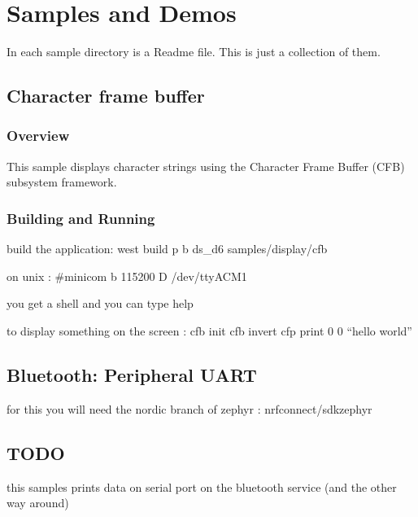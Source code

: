 \documentclass[letterpaper,10pt,english]{sphinxmanual}
\begin{document}
\chapter{Samples and Demos}
\label{\detokenize{samples/index:samples-and-demos}}\label{\detokenize{samples/index:id1}}\label{\detokenize{samples/index::doc}}
In each sample directory is a Readme file.
This is just a collection of them.


\section{Character frame buffer}
\label{\detokenize{samples/cfb/README:character-frame-buffer}}\label{\detokenize{samples/cfb/README:character-frame-buffer-sample}}\label{\detokenize{samples/cfb/README::doc}}

\subsection{Overview}
\label{\detokenize{samples/cfb/README:overview}}
This sample displays character strings using the Character Frame Buffer
(CFB) subsystem framework.


\subsection{Building and Running}
\label{\detokenize{samples/cfb/README:building-and-running}}
build the application: west build \sphinxhyphen{}p \sphinxhyphen{}b ds\_d6 samples/display/cfb

on unix : \#minicom \sphinxhyphen{}b 115200 \sphinxhyphen{}D /dev/ttyACM1

you get a shell and you can type help

to display something on the screen :
cfb init
cfb invert
cfp print 0 0 “hello world”


\section{Bluetooth: Peripheral UART}
\label{\detokenize{samples/peripheral_uart/README:bluetooth-peripheral-uart}}\label{\detokenize{samples/peripheral_uart/README:peripheral-uart}}\label{\detokenize{samples/peripheral_uart/README::doc}}
for this you will need the nordic branch of zephyr : nrfconnect/sdk\sphinxhyphen{}zephyr


\section{TODO}
\label{\detokenize{samples/peripheral_uart/README:todo}}
this samples prints data on serial port on the bluetooth service (and the other way around)
\end{document}
